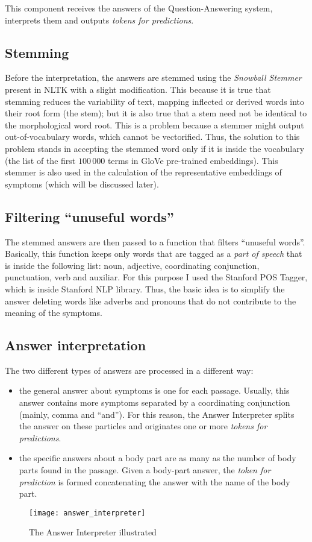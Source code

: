 This component receives the answers of the Question-Answering system, interprets them and outputs \textit{tokens for predictions}.
\subsection{Stemming}
\label{sec:stemming}
Before the interpretation, the answers are stemmed using the \textit{Snowball Stemmer} present in NLTK with a slight modification. This because it is true that stemming reduces the variability of text, mapping inflected or derived words into their root form (the stem); but it is also true that a stem need not be identical to the morphological word root. This is a problem because a stemmer might output out-of-vocabulary words, which cannot be vectorified. Thus, the solution to this problem stands in accepting the stemmed word only if it is inside the vocabulary (the list of the first $100\,000$ terms in GloVe pre-trained embeddings). This stemmer is also used in the calculation of the representative embeddings of symptoms (which will be discussed later).

\subsection{Filtering ``unuseful words''}
The stemmed answers are then passed to a function that filters ``unuseful words''. Basically, this function keeps only words that are tagged as a \textit{part of speech} that is inside the following list: noun, adjective, coordinating conjunction, punctuation, verb and auxiliar. For this purpose I used the Stanford POS Tagger, which is inside Stanford NLP library. Thus, the basic idea is to simplify the answer deleting words like adverbs and pronouns that do not contribute to the meaning of the symptoms.

\subsection{Answer interpretation}
The two different types of answers are processed in a different way:
\begin{itemize}
  \item the general answer about symptoms is one for each passage. Usually, this answer contains more symptoms separated by a coordinating conjunction (mainly, comma and ``and''). For this reason, the Answer Interpreter splits the answer on these particles and originates one or more \textit{tokens for predictions}.
  \item the specific answers about a body part are as many as the number of body parts found in the passage. Given a body-part answer, the \textit{token for prediction} is formed concatenating the answer with the name of the body part.
\end{itemize}

\begin{figure}[h]
\centering
\texttt{[image: answer\_interpreter]}
\caption{The Answer Interpreter illustrated}
\medskip
\label{fig:answer_int}
\end{figure}
